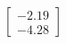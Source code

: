 \documentclass[preview]{standalone}
\begin{document}
\begin{align*}
\begin{bmatrix} -2.19 \\ -4.28 \end{bmatrix}
\end{align*}
\end{document}
